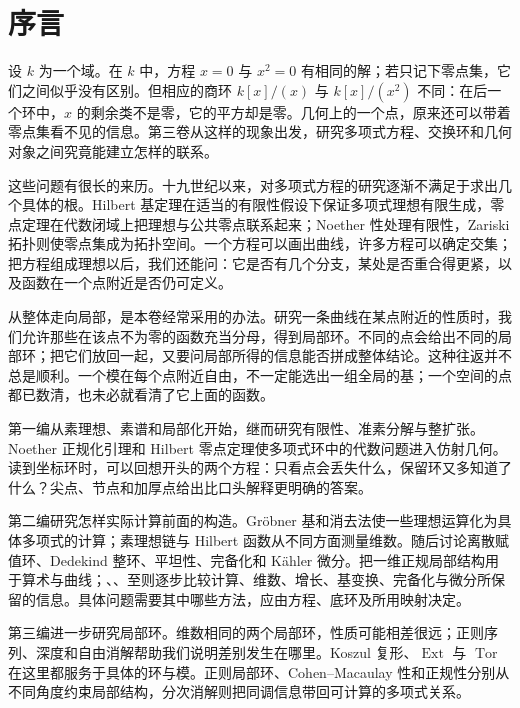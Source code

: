 \chapter*{序言}

设 \(k\) 为一个域。在 \(k\) 中，方程 \(x=0\) 与 \(x^2=0\) 有相同的解；若只记下零点集，它们之间似乎没有区别。但相应的商环 \(k[x]/(x)\) 与 \(k[x]/(x^2)\) 不同：在后一个环中，\(x\) 的剩余类不是零，它的平方却是零。几何上的一个点，原来还可以带着零点集看不见的信息。第三卷从这样的现象出发，研究多项式方程、交换环和几何对象之间究竟能建立怎样的联系。

\ProseParagraphBreak
这些问题有很长的来历。十九世纪以来，对多项式方程的研究逐渐不满足于求出几个具体的根。Hilbert 基定理在适当的有限性假设下保证多项式理想有限生成，零点定理在代数闭域上把理想与公共零点联系起来；Noether 性处理有限性，Zariski 拓扑则使零点集成为拓扑空间。一个方程可以画出曲线，许多方程可以确定交集；把方程组成理想以后，我们还能问：它是否有几个分支，某处是否重合得更紧，以及函数在一个点附近是否仍可定义。

\ProseParagraphBreak
从整体走向局部，是本卷经常采用的办法。研究一条曲线在某点附近的性质时，我们允许那些在该点不为零的函数充当分母，得到局部环。不同的点会给出不同的局部环；把它们放回一起，又要问局部所得的信息能否拼成整体结论。这种往返并不总是顺利。一个模在每个点附近自由，不一定能选出一组全局的基；一个空间的点都已数清，也未必就看清了它上面的函数。

\ProseParagraphBreak
第一编从素理想、素谱和局部化开始，继而研究有限性、准素分解与整扩张。Noether 正规化引理和 Hilbert 零点定理使多项式环中的代数问题进入仿射几何。读到坐标环时，可以回想开头的两个方程：只看点会丢失什么，保留环又多知道了什么？尖点、节点和加厚点给出比口头解释更明确的答案。

\ProseParagraphBreak
第二编研究怎样实际计算前面的构造。Gröbner 基和消去法使一些理想运算化为具体多项式的计算；素理想链与 Hilbert 函数从不同方面测量维数。随后讨论离散赋值环、Dedekind 整环、平坦性、完备化和 Kähler 微分。把一维正规局部结构用于算术与曲线；、、至则逐步比较计算、维数、增长、基变换、完备化与微分所保留的信息。具体问题需要其中哪些方法，应由方程、底环及所用映射决定。

\ProseParagraphBreak
第三编进一步研究局部环。维数相同的两个局部环，性质可能相差很远；正则序列、深度和自由消解帮助我们说明差别发生在哪里。Koszul 复形、\(\operatorname{Ext}\) 与 \(\operatorname{Tor}\) 在这里都服务于具体的环与模。正则局部环、Cohen--Macaulay 性和正规性分别从不同角度约束局部结构，分次消解则把同调信息带回可计算的多项式关系。

